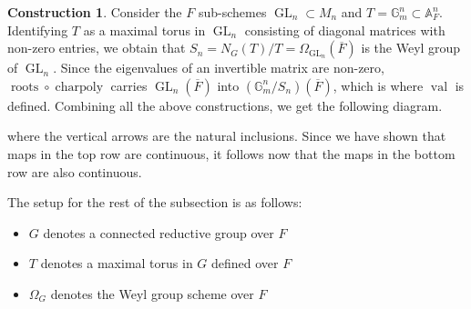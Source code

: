\documentclass[11pt,a4paper]{article}
\theoremstyle{definition}
\newtheorem{const}[shared]{Construction}
\theoremstyle{plain}
\theoremstyle{remark}
\theoremstyle{plain}
\DeclareMathOperator{\GL}{GL}
\DeclareMathOperator{\val}{val}
\DeclareMathOperator{\charpoly}{charpoly}
\DeclareMathOperator{\roots}{roots}
\begin{document}
\begin{const}\label{constructionGLn}
Consider the $F$ sub-schemes $\GL_n \subset M_n$ and $T = \mathbb{G}_m^n \subset \mathbb{A}_F^n$. Identifying $T$ as a maximal torus in $\GL_n$ consisting of diagonal matrices with non-zero entries, we obtain that $S_n = N_G(T)/T = \Omega_{\GL_n}(\overline{F})$ is the Weyl group of $\GL_n$. Since the eigenvalues of an invertible matrix are non-zero, $\roots \circ \charpoly$ carries $\GL_n(\overline{F})$ into $(\mathbb{G}_m^n/S_n)(\overline{F})$, which is where $\val$ is defined. Combining all the above constructions, we get the following diagram.
\begin{center}
\end{center}
where the vertical arrows are the natural inclusions. Since we have shown that maps in the top row are continuous, it follows now that the maps in the bottom row are also continuous.
\end{const}

The setup for the rest of the subsection is as follows:
\begin{itemize}
    \item $G$ denotes a connected reductive group over $F$
    \item $T$ denotes a maximal torus in $G$ defined over $F$
    \item $\Omega_G$ denotes the Weyl group scheme over $F$
\end{itemize}
\end{document}
